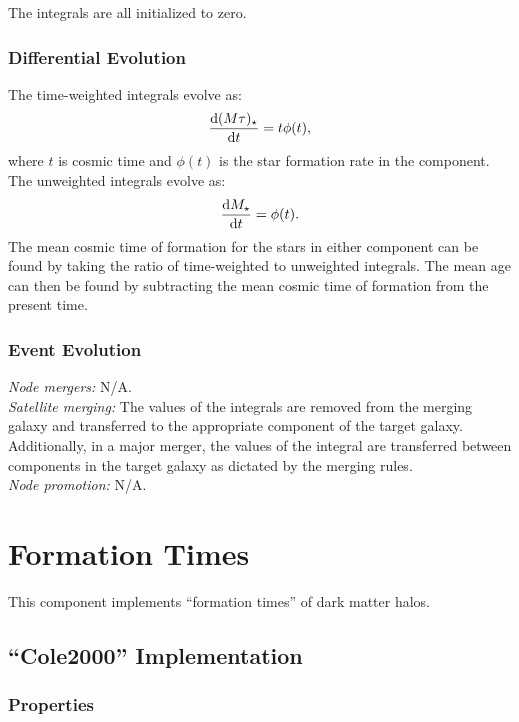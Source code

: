 The integrals are all initialized to zero.

\subsubsection{Differential Evolution}

The time-weighted integrals evolve as:
\begin{equation}
{\mathrm{d}({M\tau})_\star\over\mathrm{d}t} = t \phi(t),
\end{equation}
where $t$ is cosmic time and $\phi(t)$ is the star formation rate in the component. The unweighted integrals evolve as:
\begin{equation}
{\mathrm{d}{M}_\star\over\mathrm{d}t} = \phi(t).
\end{equation}
The mean cosmic time of formation for the stars in either component can be found by taking the ratio of time-weighted to unweighted integrals. The mean age can then be found by subtracting the mean cosmic time of formation from the present time.

\subsubsection{Event Evolution}

\noindent\emph{Node mergers:} N/A.\\

\noindent\emph{Satellite merging:} The values of the integrals are removed from the merging galaxy and transferred to the appropriate component of the target galaxy. Additionally, in a major merger, the values of the integral are transferred between components in the target galaxy as dictated by the merging rules.\\

\noindent\emph{Node promotion:} N/A.\\

\section{Formation Times}\label{sec:ComponentFormationTimes}

This \gls{component} implements ``formation times'' of dark matter halos.

\subsection{``Cole2000'' Implementation}

\subsubsection{Properties}

